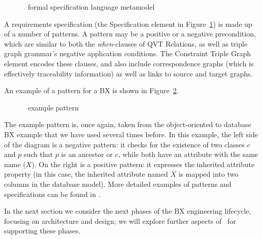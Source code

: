 \begin{figure}[htbp]
\caption{\transml\ formal specification language metamodel}
\label{fig:transml-formal-language}
\end{figure}

A requirements specification (the Specification element in Figure~\ref{fig:transml-formal-language}) is made up of a number of patterns. A pattern may be a positive or a negative precondition, which are similar to both the \textit{when}-clauses of QVT Relations, as well as triple graph grammar's negative application conditions. The Constraint Triple Graph element encodes these clauses, and also include correspondence graphs (which is effectively traceability information) as well as links to source and target graphs. 

An example of a pattern for a BX is shown in Figure~\ref{fig:transml-pattern}. 

\begin{figure}[htbp]
\caption{\transml\ example pattern}
\label{fig:transml-pattern}
\end{figure}

The example pattern is, once again, taken from the object-oriented to database BX example that we have used several times before. In this example, the left side of the diagram is a negative pattern: it checks for the existence of two classes $c$ and $p$ such that $p$ is an ancestor or $c$, while both have an attribute with the same name ($X$). On the right is a positive pattern: it expresses the inherited attribute property (in this case, the inherited attribute named $X$ is mapped into two columns in the database model). More detailed examples of patterns and specifications can be found in \cite{GuerraLKPS13}.

In the next section we consider the next phases of the BX engineering lifecycle, focusing on architecture and design; we will explore further aspects of \transml\ for supporting these phases.

